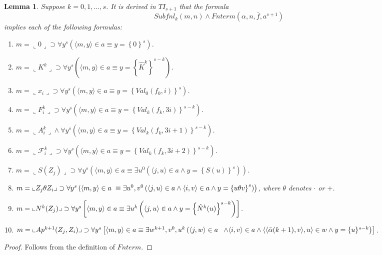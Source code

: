 \documentclass{asl}
\newtheorem{lemma}{Lemma}[section]
\theoremstyle{definition}
\begin{document}
\begin{lemma}
Suppose $k=0,1,\ldots,s$. It is derived in $TI_{s+1}$ that the formula 
\[Subfnl_k(m,n)\wedge Fnterm(\alpha,n,\bar{f},a^{s+1})\]
implies each of the following formulas:
\begin{enumerate}
\item $m=\llcorner 0\lrcorner\supset\forall y^s\left(\langle m,y\rangle\in a \equiv y=\left\lbrace 0 \right\rbrace^s \right)$.
\medskip
\item $m=\llcorner K^k\lrcorner\supset\forall y^s\left(\langle m,y\rangle\in a \equiv y=\left\lbrace \hat{K}^k \right\rbrace^{s-k} \right)$.
\medskip
\item
$m=\llcorner x_i\lrcorner \supset\forall y^s\left(\langle m,y\rangle\in a \equiv y=\left\lbrace Val_0(f_0,i) \right\rbrace^s \right)$.
\medskip
\item
$m=\llcorner F^k_i\lrcorner\supset\forall y^s\left(\langle m,y\rangle\in a \equiv y=\left\lbrace Val_k(f_k,3i) \right\rbrace^{s-k} \right)$.
\medskip
\item
$m=\llcorner A^k_i\lrcorner \wedge\forall y^s\left(\langle m,y\rangle\in a \equiv y=\left\lbrace Val_k(f_k,3i+1) \right\rbrace^{s-k} \right)$.
\medskip
\item
$m=\llcorner \mathcal{F}^k_i\lrcorner\supset\forall y^s\left(\langle m,y\rangle\in a \equiv y=\left\lbrace Val_k(f_k,3i+2) \right\rbrace^{s-k} \right)$.
\medskip
\item
$m=\llcorner S(Z_j)\lrcorner
\supset\forall y^s\left(\langle m,y\rangle\in a \equiv 
\exists u^0\left(\langle j,u\rangle\in a\wedge y=\left\lbrace S(u) \right\rbrace^s \right)\right)$.
\medskip
\item
$m=\llcorner Z_j\theta Z_i  \lrcorner 
\supset\forall y^s\left(\langle m,y\rangle\in a 
\right.
\medskip
\\
\left.
\equiv \exists u^0,v^0\left(\langle j,u\rangle\in a\wedge \langle i,v\rangle\in a\wedge y=\left\lbrace u\theta v \right\rbrace^s \right)\right)$,
where $\theta$ denotes $\cdot$ or $+$.
\medskip
\item
$m=\llcorner N^k(Z_j)\lrcorner
\\ 
\supset\forall y^s\left[\langle m,y\rangle\in a \equiv \exists u^k
\left(\langle j,u\rangle\in a\wedge y=\left\lbrace \hat{N}^k(u) \right\rbrace^{s-k} \right)
 \right]$.
\medskip
\item
$m=\llcorner Ap^{k+1}(Z_j,Z_i)\lrcorner\supset\forall y^s\left[\langle m,y\rangle\in a 
\equiv \exists w^{k+1}, v^0,u^{k}
\left(\langle j,w\rangle\in a
\right.
\right.
\smallskip
\\
\left.
\left.
\wedge 
\langle i,v\rangle\in a
\wedge
\langle\langle\bar{\alpha}(k+1),v\rangle,u\rangle\in w
\wedge y=\lbrace u\rbrace^{s-k}\right)\right]$.
\end{enumerate}
\label{lemma:frc3}
\end{lemma}
\begin{proof}
Follows from the definition of $Fnterm$.
\end{proof}
\end{document}
